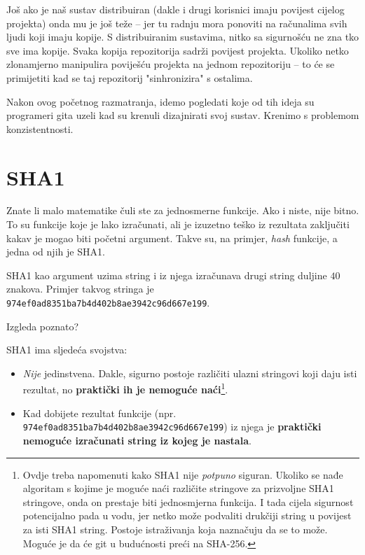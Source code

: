 Još ako je naš sustav distribuiran (dakle i drugi korisnici imaju povijest cijelog projekta) onda mu je još teže -- jer tu radnju mora ponoviti na računalima svih ljudi koji imaju kopije.
S distribuiranim sustavima, nitko sa sigurnošću ne zna tko sve ima kopije.
Svaka kopija repozitorija sadrži povijest projekta.
Ukoliko netko zlonamjerno manipulira poviješću projekta na jednom repozitoriju -- to će se primijetiti kad se taj repozitorij "sinhronizira" s ostalima.

Nakon ovog početnog razmatranja, idemo pogledati koje od tih ideja su programeri gita uzeli kad su krenuli dizajnirati svoj sustav.
Krenimo s problemom konzistentnosti.

\section*{SHA1}

Znate li malo matematike čuli ste za jednosmerne funkcije.
Ako i niste, nije bitno. 
To su funkcije koje je lako izračunati, ali je izuzetno teško iz rezultata zaključiti kakav je mogao biti početni argument.
Takve su, na primjer, \emph{hash} funkcije, a jedna od njih je SHA1.

SHA1 kao argument uzima string i iz njega izračunava drugi string duljine $40$ znakova.
Primjer takvog stringa je \verb+974ef0ad8351ba7b4d402b8ae3942c96d667e199+.

Izgleda poznato?

SHA1 ima sljedeća svojstva:

\begin{itemize}
	\item \emph{Nije} jedinstvena. Dakle, sigurno postoje različiti ulazni stringovi koji daju isti rezultat, no \textbf{praktički ih je nemoguće naći}\footnote{Ovdje treba napomenuti kako SHA1 nije \emph{potpuno} siguran. Ukoliko se nađe algoritam s kojime je moguće naći različite stringove za prizvoljne SHA1 stringove, onda on prestaje biti jednosmjerna funkcija. I tada cijela sigurnost potencijalno pada u vodu, jer netko može podvaliti drukčiji string u povijest za isti SHA1 string. Postoje istraživanja koja naznačuju da se to može. Moguće je da će git u budućnosti preći na SHA-256.}. 
	\item Kad dobijete rezultat funkcije (npr. \verb+974ef0ad8351ba7b4d402b8ae3942c96d667e199+) iz njega je \textbf{praktički nemoguće izračunati string iz kojeg je nastala}.
\end{itemize}

